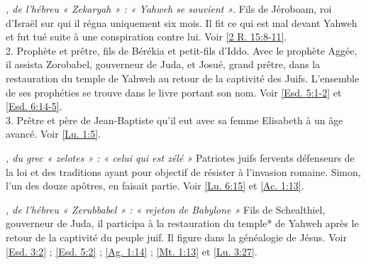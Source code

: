 \begin{multicols}{2}
\textit{, de l'hébreu « Zekaryah » : « Yahweh se souvient »}. Fils de Jéroboam, roi d'Israël sur qui il régna uniquement six mois. Il fit ce qui est mal devant Yahweh et fut tué suite à une conspiration contre lui. Voir \vref{2 R. 15:8-11}.
\\2. Prophète et prêtre, fils de Bérékia et petit-fils d'Iddo. Avec le prophète Aggée, il assista Zorobabel, gouverneur de Juda, et Josué, grand prêtre, dans la restauration du temple de Yahweh au retour de la captivité des Juifs. L'ensemble de ses prophéties se trouve dans le livre portant son nom. Voir \vref{Esd. 5:1-2} et \vref{Esd. 6:14-5}.
\\3. Prêtre et père de Jean-Baptiste qu'il eut avec sa femme Elisabeth à un âge avancé. Voir \vref{Lu. 1:5}.

\textit{, du grec « zelotes » : « celui qui est zélé »}\newline
Patriotes juifs fervents défenseurs de la loi et des traditions ayant pour objectif de résister à l'invasion romaine. Simon, l'un des douze apôtres, en faisait partie. Voir \vref{Lu. 6:15} et \vref{Ac. 1:13}.

\textit{, de l'hébreu « Zerubbabel » : « rejeton de Babylone »}\newline
Fils de Schealthiel, gouverneur de Juda, il participa à la restauration du temple* de Yahweh après le retour de la captivité du peuple juif. Il figure dans la généalogie de Jésus. Voir \vref{Esd. 3:2} ; \vref{Esd. 5:2} ; \vref{Ag. 1:14} ; \vref{Mt. 1:13} et \vref{Lu. 3:27}.

\end{multicols}

